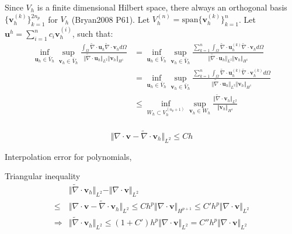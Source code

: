 Since $V_h$ is a finite dimensional Hilbert space, there always an orthogonal basis $\{\boldsymbol v_h^{(k)}\}_{k=1}^{2n_p}$ for $V_h$ (Bryan2008 P61). Let $V_h^{(n)} = \textrm{span} \{\boldsymbol v_h^{(k)}\}_{k=1}^{n}$. Let $\boldsymbol u^h = \sum_{i=1}^{n} c_i \boldsymbol v_h^{(i)}$, such that:
\begin{equation}
\begin{split}
    \inf_{\boldsymbol u_h \in \bar V_h} \sup_{\boldsymbol v_h \in \bar V_h} \frac{\int_\Omega \tilde \nabla \cdot \boldsymbol u_h \tilde{\nabla} \cdot \boldsymbol v_h d\Omega}{\Vert \tilde \nabla \cdot \boldsymbol u_h \Vert_{L^2} \Vert \boldsymbol v_h \Vert_{H^1}} 
    &= \inf_{\boldsymbol u_h \in \bar V_h} \sup_{\boldsymbol v_h \in \bar V_h} \frac{\sum_{k=1}^{n} \int_\Omega \tilde \nabla \cdot \boldsymbol u_h^{(k)} \tilde \nabla \cdot \boldsymbol v_h d\Omega}{\Vert \tilde \nabla \cdot \boldsymbol u_h \Vert_{L^2} \Vert \boldsymbol v_h \Vert_{H^1}} \\
    &= \inf_{\boldsymbol u_h \in \bar V_h} \sup_{\boldsymbol v_h \in \bar V_h} \frac{\sum_{k=1}^{n} \int_\Omega \tilde \nabla \cdot \boldsymbol u_h^{(k)} \tilde \nabla \cdot \boldsymbol v_h^{(k)} d\Omega}{\Vert \tilde \nabla \cdot \boldsymbol u_h \Vert_{L^2} \Vert \boldsymbol v_h \Vert_{H^1}} \\
    &\le \inf_{W_h \subset V_h^{(n_p+1)}} \sup_{\boldsymbol v_h \in W_h} \frac{\Vert \tilde \nabla \cdot \boldsymbol v_h \Vert_{L^2}}{\Vert \boldsymbol v_h \Vert_{H^1}} \\
\end{split}
\end{equation}


\begin{equation}
\Vert \nabla \cdot \boldsymbol v - \tilde \nabla \cdot \boldsymbol v_h \Vert_{L^2} \le C h 
\end{equation}

Interpolation error for polynomials, 

Triangular inequality
\begin{equation}
\begin{split}
    &\Vert \tilde \nabla \cdot \boldsymbol v_h \Vert_{L^2} - \Vert \nabla \cdot \boldsymbol v \Vert_{L^2} \\ 
    \le& \Vert \nabla \cdot \boldsymbol v - \tilde \nabla \cdot \boldsymbol v_h \Vert_{L^2}
    \le Ch^{p} \Vert \nabla \cdot \boldsymbol v \Vert_{H^{p+1}} 
    \le C' h^p \Vert \nabla \cdot \boldsymbol v \Vert_{L^2} \\
    \Rightarrow& \Vert \tilde \nabla \cdot \boldsymbol v_h \Vert_{L^2} \le (1+C') h^p \Vert \nabla \cdot \boldsymbol v \Vert_{L^2} = C'' h^p \Vert \nabla \cdot \boldsymbol v \Vert_{L^2}
\end{split}
\end{equation}

